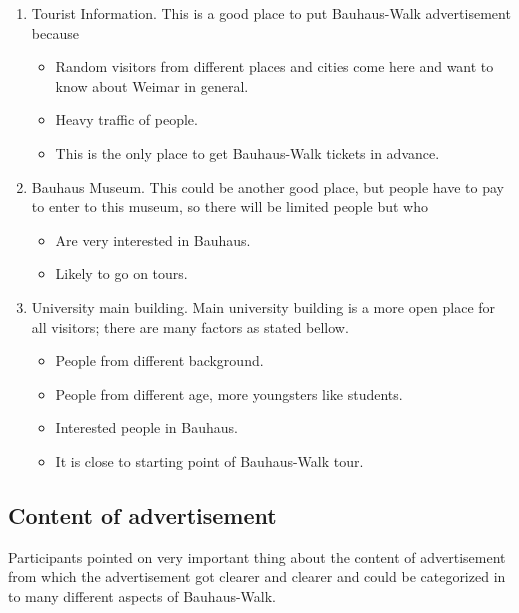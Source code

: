 \begin {enumerate}

\item	Tourist Information.
This is a good place to put Bauhaus-Walk advertisement because 
\begin {itemize}
\item	Random visitors from different places and cities come here and want to know about Weimar in general. 
\item	Heavy traffic of people.
\item	This is the only place to get Bauhaus-Walk tickets in advance.
\end{itemize}


\item	Bauhaus Museum.
This could be another good place, but people have to pay to enter to this museum, so there will be limited people but who
\begin {itemize}
\item	Are very interested in Bauhaus.
\item	Likely to go on tours.
\end{itemize}


\item	University main building.
Main university building is a more open place for all visitors; there are many factors as stated bellow.

\begin {itemize}
\item	People from different background.	
\item	People from different age, more youngsters like students.
\item	Interested people in Bauhaus.
\item	It is close to starting point of Bauhaus-Walk tour.
\end{itemize}


\end{enumerate}


\subsection{Content of advertisement}
Participants pointed on very important thing about the content of advertisement from which the advertisement got clearer and clearer and could be categorized in to many different aspects of Bauhaus-Walk.


